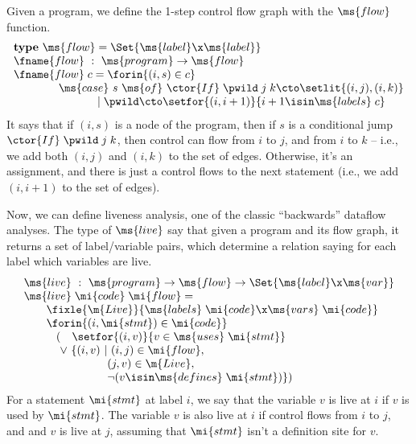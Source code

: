 Given a program, we define the 1-step control flow graph with the $\ms{flow}$
function.
\[\begin{array}{l}
\textbf{type}~\ms{flow} = \Set{\ms{label} \x \ms{label}}\\
\fname{flow} ~:~ \ms{program} \uto \ms{flow}\\
\fname{flow}\;c = \forin{(i,s) \in c}\\
\hspace{4em}\ms{case}~ s ~\ms{of}~
\ctor{If} \;\pwild \;j \;k \cto \setlit{(i,j),(i,k)}\\
\hspace{7.45em}\pipe\pwild \cto \setfor{(i,i+1)}{i+1 \isin \ms{labels}\;c}
\end{array}
\]
It says that if $(i, s)$ is a node of the program, then if $s$ is a
conditional jump $\ctor{If} \;\pwild \;j \;k$, then control can flow from $i$
to $j$, and from $i$ to $k$ -- i.e., we add both $(i, j)$ and $(i, k)$ to the
set of edges. Otherwise, it's an assignment, and there is just a control flows
to the next statement (i.e., we add $(i, i+1)$ to the set of edges).

Now, we can define liveness analysis, one of the classic ``backwards'' dataflow
analyses. The type of $\ms{live}$ say that given a program and its flow graph,
it returns a set of label/variable pairs, which determine a relation saying
for each label which variables are live.
\[\begin{array}{l}
\ms{live} ~:~ \ms{program} \uto \ms{flow} \uto \Set{\ms{label} \x \ms{var}}\\
\ms{live} \;\mi{code} \;\mi{flow} =\\
\hspace{2em} \fixle{\m{Live}}{ %
  \ms{labels}\;\mi{code} \x \ms{vars}\;\mi{code}}\\
\hspace{2em}\forin{(i,\mi{stmt}) \in \mi{code}}\\
\hspace{2.875em} (\phantom{\vee~}\setfor{(i,v)}{v \in \ms{uses}\;\mi{stmt}}\\
\hspace{3.2em} \vee~ \{(i,v) ~|~ (i,j) \in \mi{flow},\\
\hspace{7.4em}(j,v) \in \m{Live},\\
\hspace{7.4em}\neg (v \isin \ms{defines}\; \mi{stmt})\})
\end{array}\]
For a statement $\mi{stmt}$ at label $i$, we say that the variable
$v$ is live at $i$ if $v$ is used by $\mi{stmt}$. The variable $v$
is also live at $i$ if control flows from $i$ to $j$, and and $v$
is live at $j$, assuming that $\mi{stmt}$ isn't a definition site for $v$.

